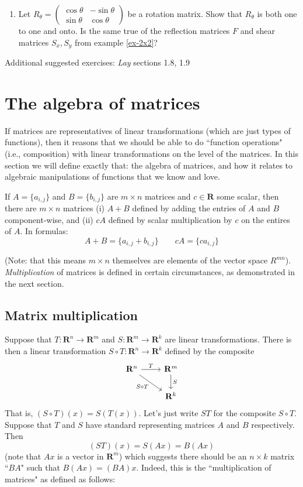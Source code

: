 \documentclass[12pt]{article}
\numberwithin{equation}{subsection}
\numberwithin{figure}{subsection}
\theoremstyle{note}
\begin{document}
\begin{enumerate}[label=\arabic*.]
	\item Let $R_{\theta}=\begin{pmatrix} \cos\theta & -\sin\theta \\ \sin \theta & \cos \theta\end{pmatrix}$ be a rotation matrix. Show that $R_{\theta}$ is both one to one and onto. Is the same true of the reflection matrices $F$ and shear matrices $S_x,S_y$ from example \ref{ex-2x2}?
\end{enumerate}

Additional suggested exercises: \textit{Lay} sections 1.8, 1.9



\section{The algebra of matrices}
If matrices are representatives of linear transformations (which are just types of functions), then it reasons that we should be able to do ``function operations" (i.e., composition) with linear transformations on the level of the matrices. In this section we will define exactly that: the algebra of matrices, and how it relates to algebraic manipulations of functions that we know and love. 

If $A=\{a_{i,j}\}$ and $B=\{b_{i,j}\}$ are $m\times n$ matrices and $c\in \mathbf{R}$ some scalar, then there are $m\times n$ matrices (i) $A+B$ defined by adding the entries of $A$ and $B$ component-wise, and (ii) $cA$ defined by scalar multiplication by $c$ on the entires of $A$. In formulas:  \begin{equation} A+B=\{a_{i,j}+b_{i,j}\} \qquad cA=\{ca_{i,j}\} \label{eq-add-mat} \end{equation}

(Note: that this means $m\times n$ themselves are elements of the vector space $R^{mn}$). \textit{Multiplication} of matrices is defined in certain circumstances, as demonstrated in the next section.

\subsection{Matrix multiplication}
Suppose that $T\colon \mathbf{R}^n\to\mathbf{R}^m$ and $S\colon \mathbf{R}^m\to\mathbf{R}^k$ are linear transformations. There is then a linear transformation $S\circ T\colon \mathbf{R}^n\to \mathbf{R}^k$ defined by the composite \[ \begin{tikzcd} \mathbf{R}^n \arrow{r}{T} \arrow{rd}[swap]{S\circ T} & \mathbf{R}^m \arrow{d}{S} \\ & \mathbf{R}^k \end{tikzcd}\]
That is, $(S\circ T)(x)=S(T(x))$. Let's just write $ST$ for the composite $S\circ T$. Suppose that $T$ and $S$ have standard representing matrices $A$ and $B$ respectively. Then \[ (ST)(x)=S(Ax)=B(Ax)\] (note that $Ax$ is a vector in $\mathbf{R}^m$) which suggests there should be an $n\times k$ matrix ``$BA$" such that $B(Ax)=(BA)x$. Indeed, this is the ``multiplication of matrices" as defined as follows:
\end{document}

